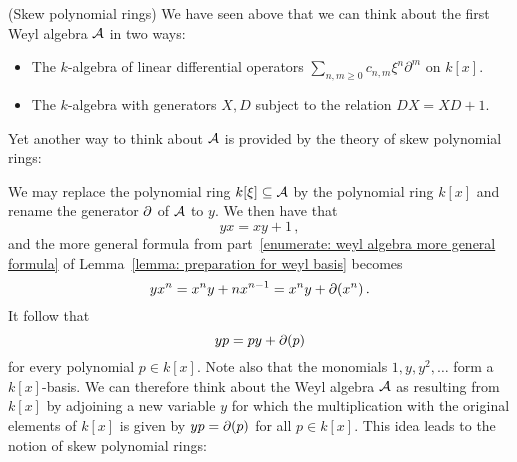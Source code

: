 \begin{remark}(Skew polynomial rings)
  \label{remark: skew polynomial rings}
  We have seen above that we can think about the first Weyl algebra $\operatorname{\mathcal{A}}$ in two ways:
  \begin{itemize}
    \item
      The $k$-algebra of linear differential operators $\sum_{n,m \geq 0} c_{n,m} \xi^n \partial^m$ on $k[x]$.
    \item
      The $k$-algebra with generators $X, D$ subject to the relation $D X = X D + 1$.
  \end{itemize}
  Yet another way to think about $\operatorname{\mathcal{A}}$ is provided by the theory of skew polynomial rings:
  
  We may replace the polynomial ring $k[\xi] \subseteq \operatorname{\mathcal{A}}$ by the polynomial ring $k[x]$ and rename the generator $\partial$ of $\operatorname{\mathcal{A}}$ to $y$.
  We then have that
  \[
    yx = xy + 1 \,,
  \]
  and the more general formula from part~\ref*{enumerate: weyl algebra more general formula} of Lemma~\ref{lemma: preparation for weyl basis} becomes
  \begin{equation}
    \label{equation: motivation skew polynomial ring}
      y x^n
    = x^n y + n x^{n-1}
    = x^n y + \partial(x^n) \,.
  \end{equation}
  It follow that
  \[
      y p
    = p y + \partial(p)
  \]
  for every polynomial $p \in k[x]$.
  Note also that the monomials $1, y, y^2, \dotsc$ form a $k[x]$-basis.
  We can therefore think about the Weyl algebra $\operatorname{\mathcal{A}}$ as resulting from $k[x]$ by adjoining a new variable $y$ for which the multiplication with the original elements of $k[x]$ is given by $y p = \partial(p)$ for all $p \in k[x]$.
  This idea leads to the notion of skew polynomial rings:
  

\end{remark}
